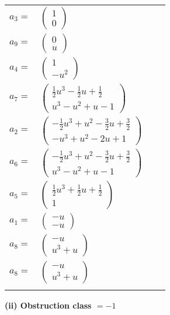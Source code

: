 \documentclass[1p]{elsarticle_modified}
\theoremstyle{definition}
\begin{document}
\begin{tabular}{m{7pt} m{180pt} m{7pt} m{180pt} }
\flushright $a_{3}=$&$\begin{pmatrix}1\\0\end{pmatrix}$ \\
\flushright $a_{9}=$&$\begin{pmatrix}0\\u\end{pmatrix}$ \\
\flushright $a_{4}=$&$\begin{pmatrix}1\\- u^2\end{pmatrix}$ \\
\flushright $a_{7}=$&$\begin{pmatrix}\frac{1}{2} u^3-\frac{1}{2} u+\frac{1}{2}\\u^3- u^2+u-1\end{pmatrix}$ \\
\flushright $a_{2}=$&$\begin{pmatrix}-\frac{1}{2} u^3+u^2-\frac{3}{2} u+\frac{3}{2}\\- u^3+u^2-2 u+1\end{pmatrix}$ \\
\flushright $a_{6}=$&$\begin{pmatrix}-\frac{1}{2} u^3+u^2-\frac{3}{2} u+\frac{3}{2}\\u^3- u^2+u-1\end{pmatrix}$ \\
\flushright $a_{5}=$&$\begin{pmatrix}\frac{1}{2} u^3+\frac{1}{2} u+\frac{1}{2}\\1\end{pmatrix}$ \\
\flushright $a_{1}=$&$\begin{pmatrix}- u\\- u\end{pmatrix}$ \\
\flushright $a_{8}=$&$\begin{pmatrix}- u\\u^3+u\end{pmatrix}$\\ \flushright $a_{8}=$&$\begin{pmatrix}- u\\u^3+u\end{pmatrix}$\\&\end{tabular}
\flushleft \textbf{(ii) Obstruction class $= -1$}\\~\\
\end{document}
